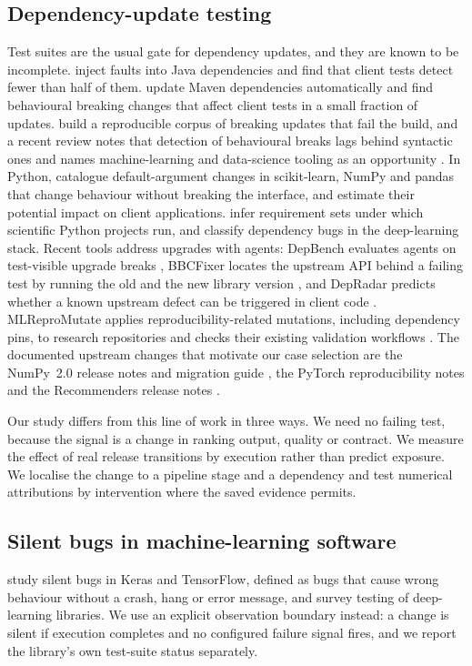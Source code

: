 \documentclass[11pt,a4paper]{article}
\begin{document}
\subsection{Dependency-update testing}
Test suites are the usual gate for dependency updates, and they are known to
be incomplete. \citet{hejderup2022trust} inject faults into Java
dependencies and find that client tests detect fewer than half of them.
\citet{jayasuriya2024behavioral} update Maven dependencies automatically and
find behavioural breaking changes that affect client tests in a small
fraction of updates. \citet{reyes2024bump} build a reproducible corpus of
breaking updates that fail the build, and a recent review notes that
detection of behavioural breaks lags behind syntactic ones and names
machine-learning and data-science tooling as an opportunity
\citep{chen2026breakingslr}. In Python, \citet{montandon2025dabc}
catalogue default-argument changes in scikit-learn, NumPy and pandas that change
behaviour without breaking the interface, and estimate their potential impact
on client applications. \citet{lei2026pcreq} infer requirement sets under
which scientific Python projects run, and \citet{huang2023dependencybugs}
classify dependency bugs in the deep-learning stack. Recent tools address
upgrades with agents: DepBench evaluates agents on test-visible upgrade breaks
\citep{luo2026depbench}, BBCFixer locates the upstream API behind a failing
test by running the old and the new library version \citep{chen2026bbcfixer},
and DepRadar predicts whether a known upstream defect can be triggered in
client code \citep{gao2026depradar}. MLReproMutate applies
reproducibility-related mutations, including dependency pins, to research
repositories and checks their existing validation workflows
\citep{shulepov2026mutation}. The documented upstream changes that
motivate our case selection are the NumPy~2.0 release notes and migration
guide \citep{numpy2releasenotes,numpy2migration}, the PyTorch reproducibility
notes \citep{pytorchreproducibility} and the Recommenders release notes
\citep{recommendersreleases}.

Our study differs from this line of work in three ways. We need no failing
test, because the signal is a change in ranking output, quality or contract.
We measure the effect of real release transitions by execution rather than
predict exposure. We localise the change to a pipeline stage and a dependency
and test numerical attributions by intervention where the saved evidence
permits.

\subsection{Silent bugs in machine-learning software}
\citet{tambon2024silent} study silent bugs in Keras and TensorFlow, defined as
bugs that cause wrong behaviour without a crash, hang or error message, and
\citet{zhang2025dllibtesting} survey testing of deep-learning libraries. We
use an explicit observation boundary instead: a change is silent if
execution completes and no configured failure signal fires, and we report the
library's own test-suite status separately.
\end{document}
